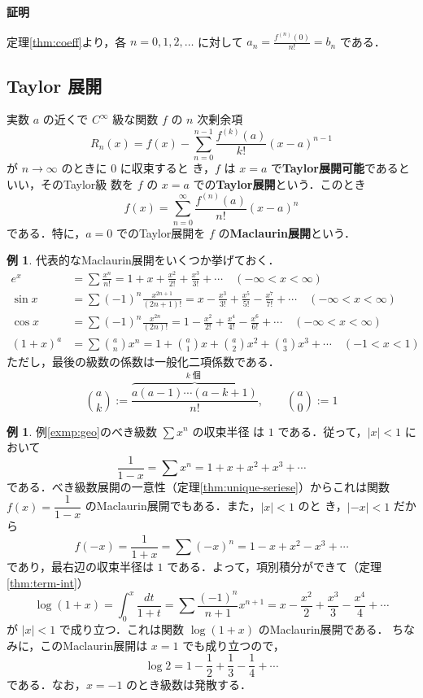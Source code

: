 \documentclass[10pt, uplatex, dvipdfmx]{jsarticle}
\makeatletter
\renewenvironment{proof}[1][\proofname]{\par
  \pushQED{\qed}%
  \normalfont \topsep6\p@\@plus6\p@\relax
  \trivlist
  \item\relax
  {\bfseries
  #1\@addpunct{.}}\hspace\labelsep\ignorespaces
}{%
  \popQED\endtrivlist\@endpefalse
}
\theoremstyle{definition}
\newtheorem{example}[theorem]{例}
\renewcommand{\proofname}{\textbf{証明}}
\numberwithin{equation}{section}
\newcommand{\ds}{\displaystyle}
\makeatother
\begin{document}
\begin{proof}
  定理\ref{thm:coeff}より，各 $n=0,1,2,\ldots$ に対して
  $\ds a_n = \frac{f^{(n)}(0)}{n!} =b_n$ である．
\end{proof}

\newpage

\subsection{Taylor 展開}

実数 $a$ の近くで $C^{\infty}$ 級な関数 $f$ の $n$ 次剰余項
\[
  R_n(x) = f(x) -\sum_{n=0}^{n-1}\frac{f^{(k)}(a)}{k!}(x-a)^{n-1}
\]
が $n \to \infty$ のときに $0$ に収束すると
き，$f$ は $x=a$ で\textbf{Taylor展開可能}であるといい，そのTaylor級
数を $f$ の $x=a$ での\textbf{Taylor展開}という．このとき
\[
  f(x) = \sum_{n=0}^{\infty} \frac{f^{(n)}(a)}{n!}(x-a)^n
\]
である．特に，$a=0$ でのTaylor展開を $f$ の\textbf{Maclaurin展開}という．

\begin{example}\label{exmp:taylor-serieses}
  代表的なMaclaurin展開をいくつか挙げておく．
  \[
    \begin{aligned}
      e^x &= \sum \frac{x^n}{n!} = 1 + x +
            \frac{x^2}{2!} + \frac{x^3}{3!} + \cdots \quad (-\infty < x <
            \infty)\\
      \sin x & = \sum (-1)^n \frac{x^{2n+1}}{(2n+1)!}
               = x - \frac{x^3}{3!} + \frac{x^5}{5!} -\frac{x^7}{7!} + \cdots \quad (-\infty < x < \infty)\\
      \cos x &= \sum (-1)^n \frac{x^{2n}}{(2n)!}
               = 1 - \frac{x^2}{2!} + \frac{x^4}{4!}-\frac{x^6}{6!}+\cdots \quad (-\infty < x < \infty)\\
      (1+x)^{a} &= \sum \binom{a}{n}x^n = 1 + \binom{a}{1}x + \binom{a}{2}x^2
                  + \binom{a}{3}x^3 + \cdots \quad (-1 < x < 1)
        \end{aligned}
      \]
      ただし，最後の級数の係数は一般化二項係数である．
      \[
        \binom{a}{k} := \frac{\overbrace{a(a-1)\cdots(a-k+1)}^{k \text{ 個 }}}{n!}, \qquad \binom{a}{0}:=1
      \]
    \end{example}


\begin{example}\label{exmp:log-taylor}
  例\ref{exmp:geo}のべき級数 $\sum  x^n$ の収束半径
  は $1$ である．従って，$|x|<1$ において
  \[
    \frac{1}{1-x} = \sum x^n = 1 + x + x^2 + x^3 + \cdots 
  \]
  である．べき級数展開の一意性（定理\ref{thm:unique-seriese}）からこれは関数 $
  f(x)=\dfrac{1}{1-x}$ のMaclaurin展開でもある．また，$|x|<1$ のと
  き，$|-x|<1$ だから
  \[
    f(-x) = \frac{1}{1+x} = \sum (-x)^n = 1 -x + x^2 - x^3 + \cdots 
  \]
  であり，最右辺の収束半径は $1$ である．よって，項別積分ができて（定理\ref{thm:term-int}）
  \[
    \log(1+x) = \int_{0}^{x} \frac{dt}{1+t} = \sum \frac{(-1)^n}{n+1} x^{n+1}
    = x - \frac{x^2}{2} + \frac{x^3}{3} - \frac{x^4}{4} + \cdots 
  \]
  が $|x|<1$ で成り立つ．これは関数 $\log(1+x)$ のMaclaurin展開である．
  ちなみに，このMaclaurin展開は $x=1$ でも成り立つので，
  \[
    \log 2 = 1 - \frac{1}{2} + \frac{1}{3} - \frac{1}{4} + \cdots
  \]
  である．なお，$x=-1$ のとき級数は発散する．
\end{example}
\end{document}
